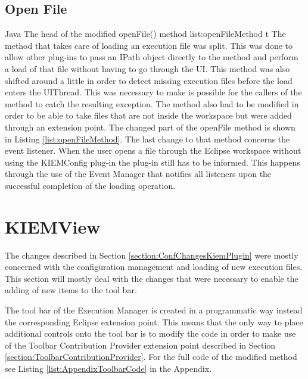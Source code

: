 \subsection{Open File}
\label{section:ConfKiemOpenFile}
\listingjava
{}
{Java}
{The head of the modified openFile() method}
{list:openFileMethod}
{t}
The method that takes care of loading an execution file was split. This was done to allow
other plug-ins to pass an IPath object directly to the method and perform a load of that file without
having to go through the \ac{UI}. This method was also shifted around a little in order to detect
missing execution files before the load enters the \ac{UI}Thread. This was necessary to make is possible for
the callers of the method to catch the resulting exception.
The method also had to be modified in order to be able to take files that are not inside the workspace
but were added through an extension point. The changed part of the openFile method is shown in 
Listing \ref{list:openFileMethod}.
The last change to that method concerns the event listener. When the user opens a file through the
Eclipse workspace without using the \ac{KIEMConfig} plug-in the plug-in still has to be informed.
This happens through the use of the Event Manager that notifies all listeners upon the successful
completion of the loading operation.


\section{KIEMView}
\label{section:ConfChangesKiemView}
The changes described in Section \ref{section:ConfChangesKiemPlugin} were mostly concerned with the
configuration management and loading of new execution files. This section will mostly deal with the changes
that were necessary to enable the adding of new items to the tool bar.

The tool bar of the Execution Manager is created in a programmatic way instead the
corresponding Eclipse extension point. This means that the only way to place additional controls onto the tool bar
is to modify the code in order to make use of the Toolbar Contribution Provider extension point described
in Section \ref{section:ToolbarContributionProvider}. For the full code of the modified method see 
Listing \ref{list:AppendixToolbarCode} in the Appendix.
